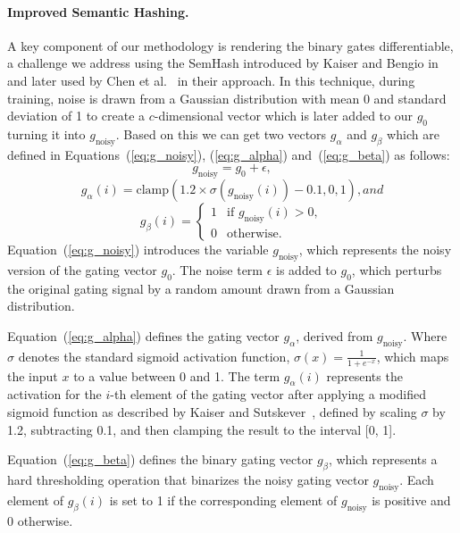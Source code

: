 \documentclass[runningheads]{llncs}
\begin{document}
\paragraph{Improved Semantic Hashing.} 
A key component of our methodology is rendering the binary gates differentiable, a challenge we address using the SemHash introduced by Kaiser and Bengio in~\cite{kaiser2018discrete} and later used by Chen et al.~\cite{chen2019you} in their approach. In this technique, during training, noise is drawn from a Gaussian distribution with mean 0 and standard deviation of 1 to create a \( c \)-dimensional vector which is later added to our \( g_0 \) turning it into \( g_{\text{noisy}} \). Based on this we can get two vectors \( g_{\alpha} \) and \( g_{\beta} \) which are defined in Equations~(\ref{eq:g_noisy}), (\ref{eq:g_alpha}) and~(\ref{eq:g_beta}) as follows:
\begin{equation}
g_{\text{noisy}} = g_0 + \epsilon, \label{eq:g_noisy}
\end{equation}
\begin{equation}
g_{\alpha}(i) = \text{clamp}(1.2 \times \sigma(g_{\text{noisy}}(i)) - 0.1, 0, 1), and \label{eq:g_alpha}
\end{equation}
\begin{equation}
g_{\beta}(i) = 
\begin{cases}
1 & \text{if } g_{\text{noisy}}(i) > 0, \\
0 & \text{otherwise}.
\end{cases} \label{eq:g_beta}
\end{equation}
Equation~(\ref{eq:g_noisy}) introduces the variable \( g_{\text{noisy}} \), which represents the noisy version of the gating vector \( g_0 \). The noise term \( \epsilon \) is added to \( g_0 \), which perturbs the original gating signal by a random amount drawn from a Gaussian distribution.

Equation~(\ref{eq:g_alpha}) defines the gating vector \( g_{\alpha} \), derived from \( g_{\text{noisy}} \). Where \( \sigma \) denotes the standard sigmoid activation function, \( \sigma(x) = \frac{1}{1 + e^{-x}} \), which maps the input \( x \) to a value between 0 and 1. The term \( g_{\alpha}(i) \) represents the activation for the \( i \)-th element of the gating vector after applying a modified sigmoid function as described by Kaiser and Sutskever~\cite{kaiser2015neural}, defined by scaling \( \sigma \) by 1.2, subtracting 0.1, and then clamping the result to the interval [0, 1].

Equation~(\ref{eq:g_beta}) defines the binary gating vector \( g_{\beta} \), which represents a hard thresholding operation that binarizes the noisy gating vector \( g_{\text{noisy}} \). Each element of \( g_{\beta}(i) \) is set to 1 if the corresponding element of \( g_{\text{noisy}} \) is positive and 0 otherwise.
\end{document}
